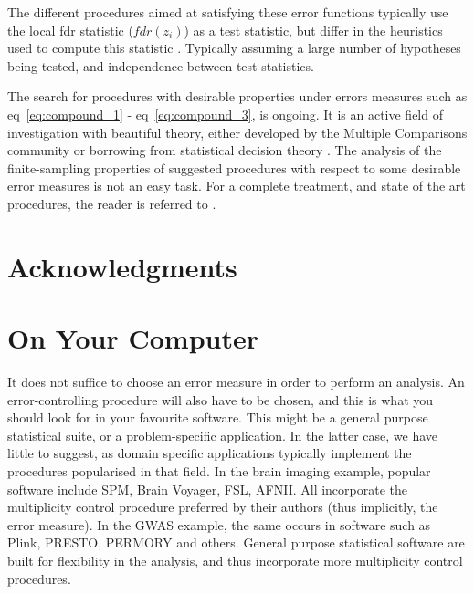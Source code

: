 \documentclass[review,12pt]{article}
\begin{document}
The different procedures aimed at satisfying these error functions typically use the local fdr statistic ($fdr(z_i)$) as a test statistic, but differ in the heuristics used to  compute this statistic \cite[eg.][]{storey_direct_2002,efron_microarrays_2008,sun_oracle_2007}. Typically assuming a large number of hypotheses being tested, and independence between test statistics. 

The search for procedures with desirable properties under errors measures such as eq~\ref{eq:compound_1}  - eq~\ref{eq:compound_3}, is ongoing. It is an active field of investigation with beautiful theory, either developed by the Multiple Comparisons community or borrowing from statistical decision theory \cite[see][]{sun_oracle_2007}. The analysis of the finite-sampling properties of suggested procedures with respect to some desirable error measures is not an easy task.  For a complete treatment, and state of the art procedures, the reader is referred to \cite{efron_large-scale_2010}.








\section{Acknowledgments}








\appendix

\section{\label{sec:on_your_pc} On Your Computer}
It does not suffice to choose an error measure in order to perform an analysis. An error-controlling procedure will also have to be chosen, and this is what you should look for in your favourite software. This might be a general purpose statistical suite, or a problem-specific application. In the latter case, we have little to suggest, as domain specific applications typically implement the procedures popularised in that field. 
In the brain imaging example, popular software include SPM, Brain Voyager, FSL, AFNII. All incorporate the multiplicity control procedure preferred by their authors (thus implicitly, the error measure). 
In the GWAS example, the same occurs in software such as Plink, PRESTO, PERMORY and others. 
General purpose statistical software are built for flexibility in the analysis, and thus incorporate more multiplicity control procedures. 
\end{document}
